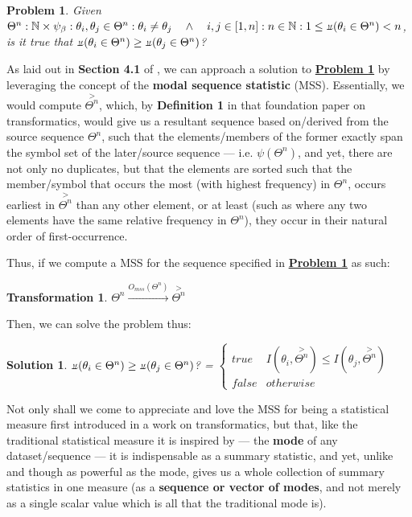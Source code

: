 \documentclass[12pt,a4paper]{article}
\newtheorem{trans}{Transformation}
\newtheorem{prob}{Problem}
\newtheorem{soln}{Solution}
\newcommand{\invpi}[1]{\mathop{\rotatebox[origin=c]{180}{$\pi$}}#1}
\begin{document}
\begin{prob}
\label{PROB1}
Given\\ $\Theta^n : \mathbb{N} \times \psi_\beta : \theta_i, \theta_j \in \Theta^n : \theta_i \neq \theta_j  \quad \land \quad i,j \in [1,n] : n \in \mathbb{N}: 1 \leq \invpi(\theta_i \in \Theta^n) < n$,\\ is it true that $\invpi(\theta_i \in \Theta^n) \geq \invpi(\theta_j \in \Theta^n)$?
\end{prob}

As laid out in \textbf{Section 4.1} of \cite{transformatics}, we can approach a solution to \textbf{\hyperref[PROB1]{Problem \ref{PROB1}}} by leveraging the concept of the \textbf{modal sequence statistic} (MSS). Essentially, we would compute $\overset{>}{\Theta^n}$, which, by \textbf{Definition 1} in that foundation paper on transformatics\cite{transformatics}, would give us a resultant sequence based on/derived from the source sequence $\Theta^n$, such that the elements/members of the former exactly span the symbol set of the later/source sequence --- i.e. $\psi(\Theta^n)$, and yet, there are not only no duplicates, but that the elements are sorted such that the member/symbol that occurs the most (with highest frequency) in $\Theta^n$, occurs earliest in  $\overset{>}{\Theta^n}$ than any other element, or at least (such as where any two elements have the same relative frequency in $\Theta^n$), they occur in their natural order of first-occurrence.

Thus, if we compute a MSS for the sequence specified in \textbf{\hyperref[PROB1]{Problem \ref{PROB1}}} as such:\\


\begin{trans}
$\Theta^n \xrightarrow{O_{mss}(\Theta^n)} \overset{>}{\Theta^n}$
\end{trans}

Then, we can solve the problem thus:\\

\begin{soln}
\label{SOLN1}
$\invpi(\theta_i \in \Theta^n) \geq \invpi(\theta_j \in \Theta^n)$? = 
$\begin{cases}
true & I(\theta_i,\overset{>}{\Theta^n}) \leq I(\theta_j,\overset{>}{\Theta^n})\\
false & otherwise
\end{cases}$
\end{soln}


Not only shall we come to appreciate and love the MSS for being a statistical measure first introduced in a work on transformatics\cite{transformatics}, but that, like the traditional statistical measure it is inspired by --- the \textbf{mode} of any dataset/sequence --- it is indispensable as a summary statistic, and yet, unlike and though as powerful as the mode, gives us a whole collection of summary statistics in one measure (as a \textbf{sequence or vector of modes}, and not merely as a single scalar value which is all that the traditional mode is). 
\end{document}

